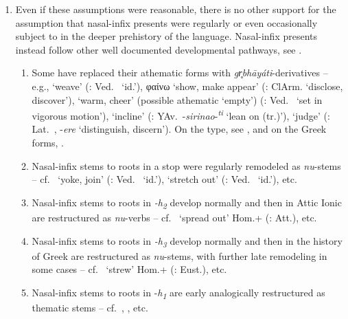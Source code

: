 \documentclass[output=paper,colorlinks,citecolor=brown]{langscibook}
\begin{document}
{\begin{enumerate}
  \item Even if these assumptions were reasonable, there is no other support for the assumption that nasal-infix presents  were regularly or even occasionally subject to  in the deeper prehistory of the language. Nasal-infix presents  instead follow other well documented developmental pathways,  see \citealt{Sturm2021}. 
  \begin{enumerate}
      \item Some have replaced their athematic forms with \textit{gr̥bhāyáti}-derivatives -- e.g.,   ‘weave’ (: Ved.\  ‘id.’), φαίνω  ‘show, make appear’ (: ClArm.  ‘disclose, discover’),   ‘warm, cheer’ (possible athematic   ‘empty’) (: Ved.\  ‘set in vigorous motion’),   ‘incline’ (: YAv.\ -\textit{sirinao}-\textit{\textsuperscript{ti}}  ‘lean on (tr.)’),   ‘judge’ (: Lat.\ , -\textit{ere} ‘distinguish, discern’). On the type, see \citealt{Jasanoff2003}, and on the Greek forms, \citealt{Kolligan2010}.
      \item Nasal-infix stems to roots in a stop were regularly remodeled as \textit{nu}-stems -- cf.\  ‘yoke, join’ (: Ved.\  ‘id.’),  ‘stretch out’ (: Ved.\  ‘id.’), etc.
      \item Nasal-infix stems to roots in \textit{{}-h}\textit{\textsubscript{2}} develop normally and then in Attic Ionic are restructured as \textit{nu}{}-verbs -- cf.\  ‘spread out’ Hom.+ (:  Att.), etc. 
      \item Nasal-infix stems to roots in \textit{{}-h}\textit{\textsubscript{3}} develop normally and then in the history of Greek are restructured as \textit{nu}-stems, with further late remodeling in some cases -- cf.\  ‘strew’ Hom.+ (:  Eust.), etc. 
      \item Nasal-infix stems to roots in -\textit{h\textsubscript{1}} are early analogically restructured as thematic stems -- cf.\ , , etc.
  \end{enumerate}

\end{enumerate}}
\end{document}
